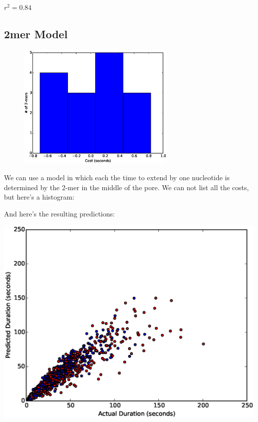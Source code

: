 \documentclass[11pt]{article}
\begin{document}
$r^2=0.84$


        \newpage
        \subsection*{2mer Model}
        \begin{figure}
        \vspace{-50pt}
        \includegraphics[width=3in]{part11hist2}
        \vspace{-70pt}
        \end{figure}
        We can use a model in which each the time to extend by one nucleotide is determined by the 2-mer in the middle of the
        pore.  We can not list all the costs, but here's a histogram:

        \vspace{1.5in}

        And here's the resulting predictions:
        
\includegraphics[width=\textwidth]{part11scatter2mer}
\end{document}
